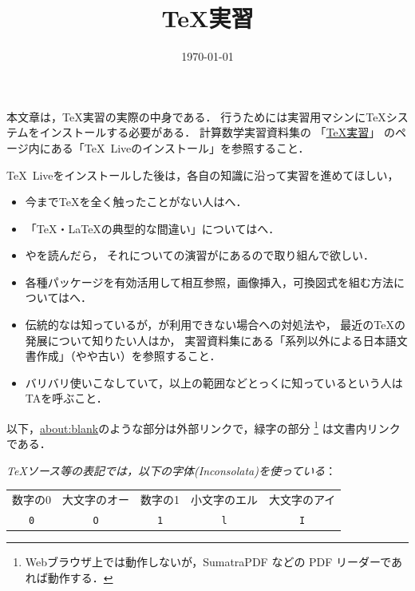 \documentclass{ltjsarticle}
\title{\TeX 実習}
\date{\today}
\author{}
\begin{document}
\VerbatimFootnotes
{}\zw
\maketitle

本文章は，\TeX 実習の実際の中身である．
行うためには実習用マシンに\TeX システムをインストールする必要がある．
計算数学実習資料集の
「\href{https://github.com/utmsks/KSImaterial/blob/master/contents/tex/tex_practice.md}{\TeX 実習}」
のページ内にある「\TeX~Liveのインストール」を参照すること．


\TeX~Liveをインストールした後は，各自の知識に沿って実習を進めてほしい，
\begin{itemize}
\item 今まで\TeX を全く触ったことがない人はへ．
\item 「\TeX・\LaTeX の典型的な間違い」についてはへ．
\item {}やを読んだら，
 それについての演習がにあるので取り組んで欲しい．
\item 各種パッケージを有効活用して相互参照，画像挿入，可換図式を組む方法についてはへ．
\item 伝統的な\pLaTeX は知っているが，\pLaTeX が利用できない場合への対処法や，
 最近の\TeX の発展について知りたい人はか，
 実習資料集にある「\pTeX 系列以外による日本語文書作成」（やや古い）を参照すること．
\item バリバリ使いこなしていて，以上の範囲などとっくに知っているという人はTAを呼ぶこと．
\end{itemize}

以下，\url{about:blank}のような部分は外部リンクで，緑字の部分
\footnote{Webブラウザ上では動作しないが，SumatraPDF などの PDF リーダーであれば動作する．}
は文書内リンクである．

\bigskip

\emph{\TeX ソース等の表記では，以下の字体(Inconsolata)を使っている}：
\begin{center}
\begin{tabular}{ccccc}
\toprule
数字の0&大文字のオー&数字の1&小文字のエル&大文字のアイ\\
\cmidrule(lr){1-2}\cmidrule(lr){3-5}
\Large\texttt{0}&\Large\texttt{O}
&\Large\texttt{1}&\Large\texttt{l}&\Large\texttt{I}\\
\bottomrule
\end{tabular}
\end{center}
\end{document}
